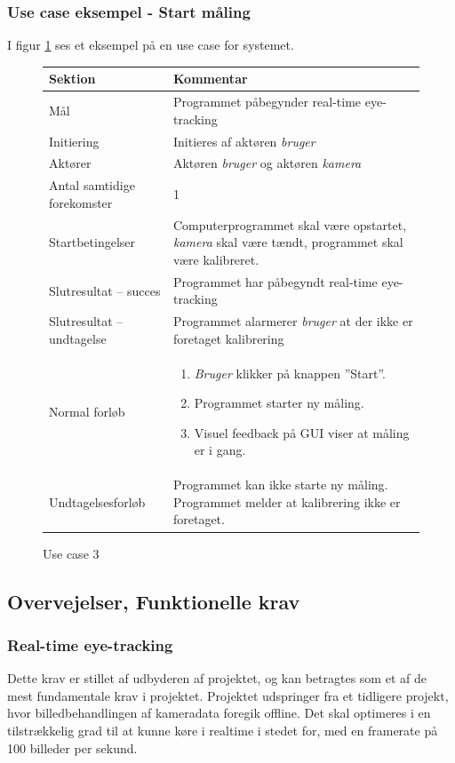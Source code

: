\documentclass[rapport.tex]{subfiles}
\begin{document}
		\subsubsection{Use case eksempel - Start måling}
		I figur \ref{fig:UC3} ses et eksempel på en use case for systemet. 
		
		\begin{figure}
		\label{fig:UC3}
		\caption{Use case 3}
		\begin{tabular}{|l|p{7.7cm}|}
			\hline \textbf{Sektion} 	& \textbf{Kommentar} \\ 
			\hline Mål  & Programmet påbegynder real-time eye-tracking \\ 
			\hline Initiering  & Initieres af aktøren \textit{bruger} \\ 
			\hline Aktører & Aktøren \textit{bruger} og aktøren \textit{kamera} \\ 
			\hline Antal samtidige forekomster & 1 \\ 
			\hline Startbetingelser & Computerprogrammet skal være opstartet, \textit{kamera} skal være tændt, programmet skal være kalibreret. \\ 
			\hline Slutresultat – succes & Programmet har påbegyndt real-time eye-tracking\\ 
			\hline Slutresultat – undtagelse & Programmet alarmerer \textit{bruger} at der ikke er foretaget kalibrering \\ 
			\hline Normal forløb & \begin{enumerate}
				\item \textit{Bruger} klikker på knappen ”Start”.
				\item Programmet starter ny måling.
				\item Visuel feedback på GUI viser at måling er i gang.
			\end{enumerate} \\  
			\hline Undtagelsesforløb & Programmet kan ikke starte ny måling. Programmet melder
			at kalibrering ikke er foretaget.\\
			\hline 
		\end{tabular}
		\end{figure}
		
	\subsection{Overvejelser, Funktionelle krav}	
	
	\subsubsection{Real-time eye-tracking}
	Dette krav er stillet af udbyderen af projektet, og kan betragtes som et af de mest fundamentale krav i projektet. Projektet udspringer fra et tidligere projekt, hvor billedbehandlingen af kameradata foregik offline. Det skal optimeres i en tilstrækkelig grad til at kunne køre i realtime i stedet for, med en framerate på 100 billeder per sekund.
	
\end{document}
